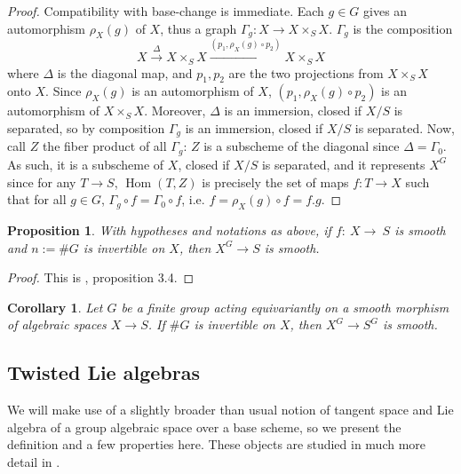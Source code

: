 \documentclass{article}
\DeclareMathOperator{\Hom}{Hom}
\newtheorem{cor}[thm]{Corollary}
\newtheorem{prop}[thm]{Proposition}
\theoremstyle{definition}
\theoremstyle{remark}
\begin{document}
\begin{proof}
Compatibility with base-change is immediate. Each $g\in G$ gives an automorphism $\rho_X(g)$ of $X$, thus a graph $\Gamma_g:X\longrightarrow X\times_S X$. $\Gamma_g$ is the composition
\[
X\xrightarrow{\Delta}X\times_S X\xrightarrow{(p_1,\rho_X(g)\circ p_2)}X\times_S X
\]
where $\Delta$ is the diagonal map, and $p_1,p_2$ are the two projections from $X\times_S X$ onto $X$. Since $\rho_X(g)$ is an automorphism of $X$, $(p_1,\rho_X(g)\circ p_2)$ is an automorphism of $X\times_S X$. Moreover, $\Delta$ is an immersion, closed if $X/S$ is separated, so by composition $\Gamma_g$ is an immersion, closed if $X/S$ is separated. Now, call $Z$ the fiber product of all $\Gamma_g$: $Z$ is a subscheme of the diagonal since $\Delta=\Gamma_{0}$. As such, it is a subscheme of $X$, closed if $X/S$ is separated, and it represents $X^G$ since for any $T\longrightarrow S$, $\Hom(T,Z)$ is precisely the set of maps $f:T\longrightarrow X$ such that for all $g\in G$, $\Gamma_g\circ f=\Gamma_0\circ f$, i.e. $f=\rho_X(g)\circ f=f.g$.
\end{proof}

\begin{prop}\label{prop lissite des points fixes si l'ordre du groupe est inversible}
With hypotheses and notations as above, if $f:~X\longrightarrow~S$ is smooth and $n:=\#G$ is invertible on $X$, then $X^G\longrightarrow S$ is smooth.
\end{prop}

\begin{proof}
This is \cite{TameRamification}, proposition 3.4.
\end{proof}

\begin{cor}
Let $G$ be a finite group acting equivariantly on a smooth morphism of algebraic spaces $X\longrightarrow S$. If $\#G$ is invertible on $X$, then $X^G\longrightarrow S^G$ is smooth.
\end{cor}


\subsection{Twisted Lie algebras}

We will make use of a slightly broader than usual notion of tangent space and Lie algebra of a group algebraic space over a base scheme, so we present the definition and a few properties here. These objects are studied in much more detail in \cite{SGA3}.
\end{document}
